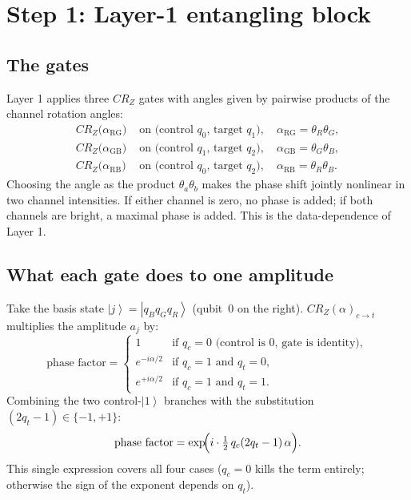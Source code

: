 \documentclass[11pt]{article}
\newcommand{\ket}[1]{\left| #1 \right\rangle}
\begin{document}
\section{Step 1: Layer-1 entangling block}

\subsection{The gates}

Layer 1 applies three $CR_Z$ gates with angles given by pairwise products of the channel rotation angles:
\begin{align*}
CR_Z\bigl(\alpha_\text{RG}\bigr) &\text{ on (control } q_0\text{, target } q_1\text{)}, \quad \alpha_\text{RG} = \theta_R \theta_G, \\
CR_Z\bigl(\alpha_\text{GB}\bigr) &\text{ on (control } q_1\text{, target } q_2\text{)}, \quad \alpha_\text{GB} = \theta_G \theta_B, \\
CR_Z\bigl(\alpha_\text{RB}\bigr) &\text{ on (control } q_0\text{, target } q_2\text{)}, \quad \alpha_\text{RB} = \theta_R \theta_B.
\end{align*}
Choosing the angle as the product $\theta_a \theta_b$ makes the phase shift jointly nonlinear in two channel intensities. If either channel is zero, no phase is added; if both channels are bright, a maximal phase is added. This is the data-dependence of Layer 1.

\subsection{What each gate does to one amplitude}

Take the basis state $\ket{j} = \ket{q_B q_G q_R}$ (qubit~0 on the right). $CR_Z(\alpha)_{c \to t}$ multiplies the amplitude $a_j$ by:
\[
\text{phase factor} = \begin{cases}
1 & \text{if } q_c = 0 \text{ (control is 0, gate is identity)}, \\
e^{-i\alpha/2} & \text{if } q_c = 1 \text{ and } q_t = 0, \\
e^{+i\alpha/2} & \text{if } q_c = 1 \text{ and } q_t = 1.
\end{cases}
\]
Combining the two control-$\ket{1}$ branches with the substitution $(2 q_t - 1) \in \{-1, +1\}$:
\[
\text{phase factor} = \exp\!\Bigl(i \cdot \tfrac{1}{2}\, q_c (2 q_t - 1)\, \alpha\Bigr).
\]
This single expression covers all four cases ($q_c = 0$ kills the term entirely; otherwise the sign of the exponent depends on $q_t$).
\end{document}
